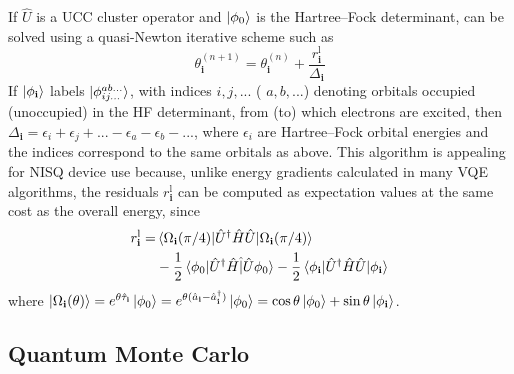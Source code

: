 \documentclass[%
 reprint,
 amsmath,amssymb,
 aps,
]{revtex4-2}
\begin{document}
If $\hat U$ is a UCC cluster operator and $\ket{\phi_0}$ is the Hartree--Fock determinant,  can be solved using a quasi-Newton iterative scheme such as\cite{Stair2021} 
\begin{equation}
\theta_\mathbf{i}^{(n+1)} =\theta_\mathbf{i}^{(n)} + \frac{r^\mathrm{l}_\mathbf{i}}{\Delta_\mathbf{i}}
\end{equation}
{ If $\ket{\phi_{\mathbf i}}$ labels $\ket{\phi_{ij...}^{ab...}}$, with indices $i,j, ...$ ( $a, b, ...$) denoting orbitals occupied (unoccupied) in the HF determinant, from (to) which electrons are excited, then  ${\Delta_\mathbf{i}} = \epsilon_i + \epsilon_j + ... - \epsilon_a - \epsilon_b - ...$, where $\epsilon_i$ are Hartree--Fock orbital energies and the indices correspond to the same orbitals as above}. This algorithm is appealing for NISQ device use because, unlike { energy gradients calculated in many VQE algorithms,} the residuals $r^\mathrm{l}_\mathbf{i}$ can be computed as expectation values at the same cost as the overall energy, since
\begin{align}
\begin{split}
r^\mathrm{l}_\mathbf{i} = &\braket{\Omega_\mathbf{i}(\pi/4)|\hat U^\dagger \hat H \hat U|\Omega_\mathbf{i}(\pi/4)} \\
&- \frac{1}{2}\braket{\phi_0|\hat U^\dagger \hat H \hat|\hat U \phi_0} -\frac{1}{2}\braket{\phi_\mathbf{i}|\hat U^\dagger \hat H \hat U|\phi_\mathbf{i}}
\end{split}
\label{eq:exp_resid}
\end{align}
where $\ket{\Omega_\mathbf{i}(\theta)} = e^{\theta \hat \tau_\mathbf{i}}\ket{\phi_0} = e^{\theta (\hat a_\mathbf{i} - \hat a_\mathbf{i}^\dagger)}\ket{\phi_0} = {\cos{\theta}\ket{\phi_0} + \sin{\theta}\ket{\phi_\mathbf{i}}}$.

\subsection{Quantum Monte Carlo}\label{sec:qmc}
\end{document}
